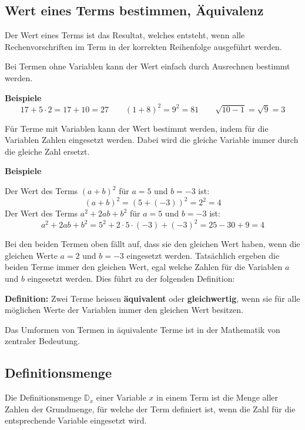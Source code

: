 \subsection{Wert eines Terms bestimmen, Äquivalenz}

Der Wert eines Terms ist das Resultat, welches entsteht, wenn alle Rechenvorschriften im Term in der korrekten Reihenfolge ausgeführt werden.

Bei Termen ohne Variablen kann der Wert einfach durch Ausrechnen bestimmt werden.
\begin{example}
\textbf{Beispiele}
\[
  17 + 5 \cdot 2 = 17 + 10 = 27 \qquad (1 + 8)^{2} = 9^{2} = 81 \qquad \sqrt{10 - 1} = \sqrt{9} = 3
\]
\end{example}

Für Terme mit Variablen kann der Wert bestimmt werden, indem für die Variablen Zahlen eingesetzt werden. Dabei wird die gleiche Variable immer durch die gleiche Zahl ersetzt.
\begin{example}
\textbf{Beispiele}

Der Wert des Terms $(a+b)^{2}$ für $a=5$ und $b=-3$ ist:
\[
  (a+b)^{2} = (5 + (-3))^{2} = 2^{2} = 4
\]
Der Wert des Terms $a^{2} + 2ab+b^{2}$ für $a=5$ und $b=-3$ ist:
\[
  a^{2}+2ab+b^{2} = 5^{2} + 2\cdot 5\cdot(-3) + (-3)^{2} = 25 - 30 + 9 = 4
\]
\end{example}

Bei den beiden Termen oben fällt auf, dass sie den gleichen Wert haben, wenn die gleichen Werte $a=2$ und $b=-3$ eingesetzt werden. Tatsächlich ergeben die beiden Terme immer den gleichen Wert, egal welche Zahlen für die Variablen $a$ und $b$ eingesetzt werden. Dies führt zu der folgenden Definition:

\textbf{Definition:} Zwei Terme heissen \textbf{äquivalent} oder \textbf{gleichwertig}, wenn sie für alle möglichen Werte der Variablen immer den gleichen Wert besitzen.

Das Umformen von Termen in äquivalente Terme ist in der Mathematik von zentraler Bedeutung.

\subsection{Definitionsmenge}

Die Definitionsmenge $\mathbb{D}_{x}$ einer Variable $x$ in einem Term ist die Menge aller Zahlen der Grundmenge, für welche der Term definiert ist, wenn die Zahl für die entsprechende Variable eingesetzt wird.

